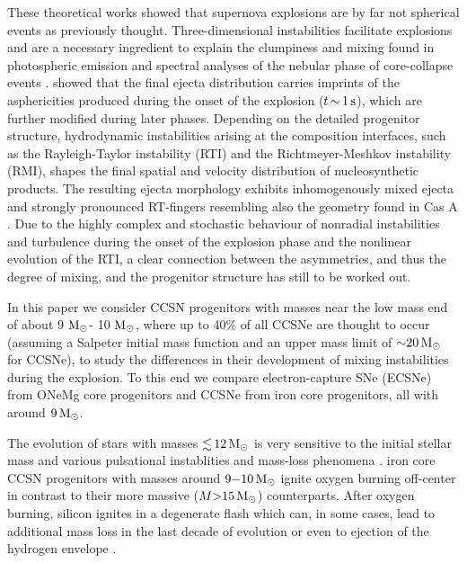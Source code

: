 \documentclass[fleqn,usenatbib]{mnras}
\newcommand{\solm}{\ensuremath{\rm{M_{\odot}}}\xspace}
\begin{document}
These theoretical works showed that supernova explosions are by far 
not spherical events as previously thought. Three-dimensional 
instabilities facilitate explosions 
\citep{Herant1994a,Burrows1995,Janka1996,Melson2015a,Mueller2017} 
and are a necessary ingredient to explain the clumpiness and 
mixing found in photospheric emission \citep{Utrobin2015,Utrobin2017} 
and spectral analyses of the nebular phase of core-collapse events \citep{Jerkstrand2017}. 
\citet{Wongwathanarat2015} showed that the final ejecta 
distribution carries imprints of the 
asphericities produced during the onset of the explosion 
($t\,\mathord{\sim}\, 1\, \rm s$), which are further modified during 
later phases. Depending on the detailed progenitor structure, hydrodynamic 
instabilities arising at the composition interfaces, such as the Rayleigh-Taylor 
instability (RTI) and the Richtmeyer-Meshkov instability (RMI), shapes 
the final spatial and velocity distribution of nucleosynthetic products. 
The resulting ejecta morphology exhibits inhomogenously mixed ejecta and 
strongly pronounced RT-fingers resembling also the geometry found in Cas A 
\citep{Wongwathanarat2017,Grefenstette2017}. Due to the highly complex and 
stochastic behaviour of nonradial instabilities and turbulence during the 
onset of the explosion phase and the nonlinear evolution of the RTI, a clear 
connection between the asymmetries, and thus the degree of mixing, and 
the progenitor structure has still to be worked out.

In this paper we consider CCSN progenitors with masses near the low 
mass end of about 9 \solm - 10 \solm, where up to 40\% of all CCSNe 
are thought to occur (assuming a Salpeter initial mass function  
\citep{Salpeter1955} and an upper mass limit of $\mathord{\sim}20\,\solm$ 
for CCSNe), to study the differences in their development of mixing 
instabilities during the explosion. To this end we compare 
electron-capture SNe (ECSNe) from ONeMg core progenitors and 
CCSNe from iron core progenitors, all with around $9\,\solm$. 

The evolution of stars with masses $\mathord{\lesssim}\,12\, \solm$ 
is very sensitive to the initial stellar mass and various 
pulsational instablities and mass-loss phenomena \citep{Woosley2015}.
iron core CCSN progenitors with masses around $9\mathord{-}10\,\solm$ 
ignite oxygen burning off-center in contrast to their more massive 
($M \mathord{>} 15\, \solm$) counterparts. After oxygen burning, silicon 
ignites in a degenerate flash which can, in some cases, lead to 
additional mass loss in the last decade of evolution or even to 
ejection of the hydrogen envelope \citet{Woosley2015}.
\end{document}
